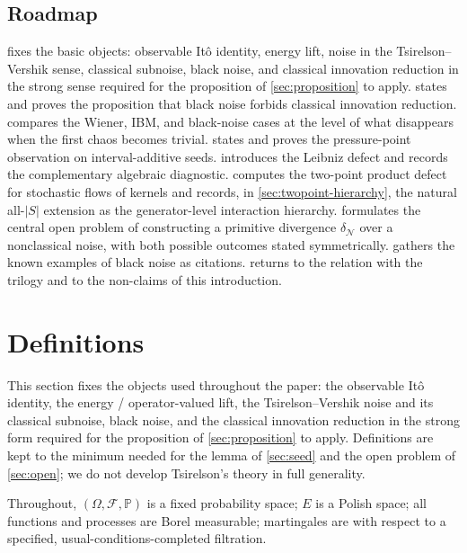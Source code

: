 \documentclass[11pt,reqno]{amsart}
\theoremstyle{plain}
\theoremstyle{definition}
\theoremstyle{remark}
\newcommand{\Prob}{\mathbb{P}}
\begin{document}
\subsection{Roadmap}\label{sec:intro-roadmap}

 fixes the basic objects: observable It\^o
identity, energy lift, noise in the Tsirelson--Vershik sense,
classical subnoise, black noise, and classical innovation reduction
in the strong sense required for the proposition of
\cref{sec:proposition} to apply.
 states and proves the proposition that black
noise forbids classical innovation reduction.
 compares the Wiener, IBM, and black-noise
cases at the level of what disappears when the first chaos becomes
trivial.  states and proves the pressure-point
observation on interval-additive seeds. 
introduces the Leibniz defect and records the complementary
algebraic diagnostic.  computes the two-point
product defect for stochastic flows of kernels and records, in
\cref{sec:twopoint-hierarchy}, the natural all-$|S|$ extension as
the generator-level interaction hierarchy.
 formulates the central open
problem of constructing a primitive divergence $\delta_{\mathcal N}$
over a nonclassical noise, with both possible outcomes stated
symmetrically.  gathers the known examples of
black noise as citations.  returns to the
relation with the trilogy and to the non-claims of this introduction.

\section{Definitions}\label{sec:definitions}

This section fixes the objects used throughout the paper: the
observable It\^o identity, the energy / operator-valued lift, the
Tsirelson--Vershik noise and its classical subnoise, black noise,
and the classical innovation reduction in the strong form required
for the proposition of \cref{sec:proposition} to apply. Definitions
are kept to the minimum needed for the lemma of \cref{sec:seed} and
the open problem of \cref{sec:open}; we do not develop Tsirelson's
theory in full generality.

Throughout, $(\Omega,\mathcal F,\Prob)$ is a fixed probability space;
$E$ is a Polish space; all functions and processes are Borel
measurable; martingales are with respect to a specified,
usual-conditions-completed filtration.
\end{document}
